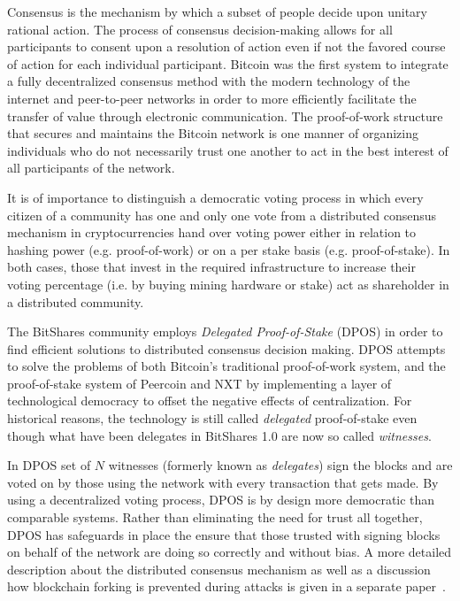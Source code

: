 \label{sec:consensus}

Consensus is the mechanism by which a subset of people decide upon unitary
rational action. The process of consensus decision-making allows for all
participants to consent upon a resolution of action even if not the favored
course of action for each individual participant. Bitcoin was the first system
to integrate a fully decentralized consensus method with the modern technology
of the internet and peer-to-peer networks in order to more efficiently
facilitate the transfer of value through electronic communication. The
proof-of-work structure that secures and maintains the Bitcoin network is one
manner of organizing individuals who do not necessarily trust one another to
act in the best interest of all participants of the network.

It is of importance to distinguish a democratic voting process in which every
citizen of a community has one and only one vote from a distributed consensus
mechanism in cryptocurrencies hand over voting power either in relation to
hashing power (e.g. proof-of-work) or on a per stake basis (e.g.
proof-of-stake). In both cases, those that invest in the required
infrastructure to increase their voting percentage (i.e. by buying mining
hardware or stake) act as shareholder in a distributed community.

The BitShares community employs \emph{Delegated Proof-of-Stake} (DPOS) in order
to find efficient solutions to distributed consensus decision making.  DPOS
attempts to solve the problems of both Bitcoin's traditional proof-of-work
system, and the proof-of-stake system of Peercoin and NXT by implementing a
layer of technological democracy to offset the negative effects of
centralization. For historical reasons, the technology is still called
\emph{delegated} proof-of-stake even though what have been delegates in
BitShares 1.0 are now so called \emph{witnesses}.

In DPOS set of $N$ witnesses (formerly known as \emph{delegates}) sign the
blocks and are voted on by those using the network with every transaction that
gets made. By using a decentralized voting process, DPOS is by design more
democratic than comparable systems. Rather than eliminating the need for trust
all together, DPOS has safeguards in place the ensure that those trusted with
signing blocks on behalf of the network are doing so correctly and without
bias. A more detailed description about the distributed consensus mechanism as
well as a discussion how blockchain forking is prevented during attacks is
given in a separate paper~\cite{}. %

